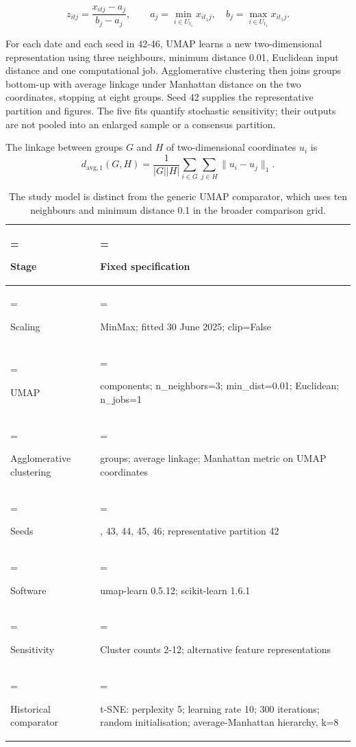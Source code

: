 \begin{equation}
z_{itj}=\frac{x_{itj}-a_j}{b_j-a_j},\qquad
a_j=\min_{i\in U_{t_1}}x_{it_1j},\quad b_j=\max_{i\in U_{t_1}}x_{it_1j}.
\label{eq:scale}\end{equation}

For each date and each seed in 42-46, UMAP \citep{mcinnes2018} learns a new two-dimensional representation using three neighbours, minimum distance 0.01, Euclidean input distance and one computational job. Agglomerative clustering then joins groups bottom-up with average linkage under Manhattan distance on the two coordinates, stopping at eight groups. Seed 42 supplies the representative partition and figures. The five fits quantify stochastic sensitivity; their outputs are not pooled into an enlarged sample or a consensus partition.


The linkage between groups $G$ and $H$ of two-dimensional coordinates $u_i$ is
\begin{equation}
d_{\mathrm{avg},1}(G,H)=\frac{1}{|G||H|}\sum_{i\in G}\sum_{j\in H}\|u_i-u_j\|_1.
\label{eq:linkage}\end{equation}

\begin{table}[htbp]
\centering\caption{The study model is distinct from the generic UMAP comparator, which uses ten neighbours and minimum distance 0.1 in the broader comparison grid.}\label{tab:3}
\footnotesize
\begin{tabularx}{\linewidth}{@{}>{\hsize=0.500\hsize\linewidth=\hsize\raggedright\arraybackslash}X >{\hsize=1.500\hsize\linewidth=\hsize\raggedright\arraybackslash}X@{}}
\toprule
Stage & Fixed specification \\
\midrule
Scaling & MinMax; fitted 30 June 2025; clip=False \\
UMAP & 2 components; n\_neighbors=3; min\_dist=0.01; Euclidean; n\_jobs=1 \\
Agglomerative clustering & 8 groups; average linkage; Manhattan metric on UMAP coordinates \\
Seeds & 42, 43, 44, 45, 46; representative partition 42 \\
Software & umap-learn 0.5.12; scikit-learn 1.6.1 \\
Sensitivity & Cluster counts 2-12; alternative feature representations \\
Historical comparator & t-SNE: perplexity 5; learning rate 10; 300 iterations; random initialisation; average-Manhattan hierarchy, k=8 \\
\bottomrule
\end{tabularx}
\end{table}


